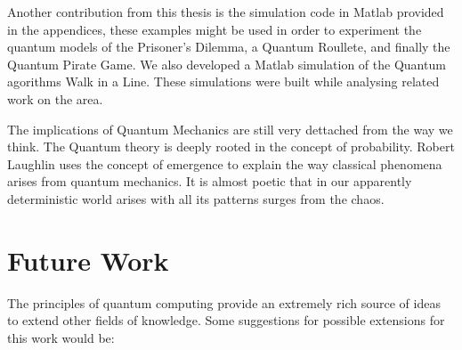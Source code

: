 Another contribution from this thesis is the simulation code in Matlab provided in the appendices, these examples might be used in order to experiment the quantum models of the Prisoner's Dilemma, a Quantum Roullete, and finally the Quantum Pirate Game. We also developed a Matlab simulation of the Quantum agorithms Walk in a Line. These simulations were built while analysing related work on the area.

The implications of Quantum Mechanics are still very dettached from the way we think. The Quantum theory is deeply rooted in the concept of probability. Robert Laughlin uses the concept of emergence to explain the way classical phenomena arises from quantum mechanics\cite{Laughlin2005}. It is almost poetic that in our apparently deterministic world arises with all its patterns surges from the chaos. 

\section{Future Work}
\label{sec:5FutureWork}

The principles of quantum computing provide an extremely rich source of ideas to extend other fields of knowledge.
Some suggestions for possible extensions for this work would be:

